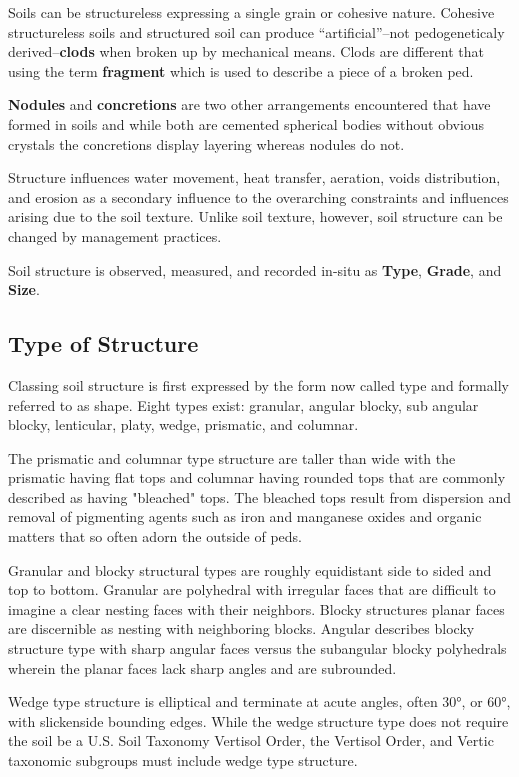 \documentclass[a5paper]{report}
\begin{document}
Soils can be structureless expressing a single grain or cohesive nature. Cohesive structureless soils and structured soil can produce “artificial”–not pedogeneticaly derived–\textbf{clods} when broken up by mechanical means. Clods are different that using the term \textbf{fragment} which is used to describe a piece of a broken ped.
    
\textbf{Nodules} and \textbf{concretions} are two other arrangements encountered that have formed in soils and while both are cemented spherical bodies without obvious crystals the concretions display layering whereas nodules do not.
    
Structure influences water movement, heat transfer, aeration, voids distribution, and erosion as a secondary influence to the overarching constraints and influences arising due to the soil texture. Unlike soil texture, however, soil structure can be changed by management practices.
    
Soil structure is observed, measured, and recorded in-situ as \textbf{Type}, \textbf{Grade}, and \textbf{Size}.
    
\subsection{Type of Structure}
    
Classing soil structure is first expressed by the form now called type and formally referred to as shape. Eight types exist: granular, angular blocky, sub angular blocky, lenticular, platy, wedge, prismatic, and columnar.

The prismatic and columnar type structure are taller than wide with the prismatic having flat tops and columnar having rounded tops that are commonly described as having "bleached" tops. The bleached tops result from dispersion and removal of pigmenting agents such as iron and manganese oxides and organic matters that so often adorn the outside of peds.

Granular and blocky structural types are roughly equidistant side to sided and top to bottom. Granular are polyhedral with irregular faces that are difficult to imagine a clear nesting faces with their neighbors. Blocky structures planar faces are discernible as nesting with neighboring blocks. Angular describes blocky structure type with sharp angular faces versus the subangular blocky polyhedrals wherein the planar faces lack sharp angles and are subrounded.

Wedge type structure is elliptical and terminate at acute angles, often \ang{30}, or \ang{60}, with slickenside bounding edges. While the wedge structure type does not require the soil be a U.S. Soil Taxonomy Vertisol Order, the Vertisol Order, and Vertic taxonomic subgroups must include wedge type structure.
\end{document}
